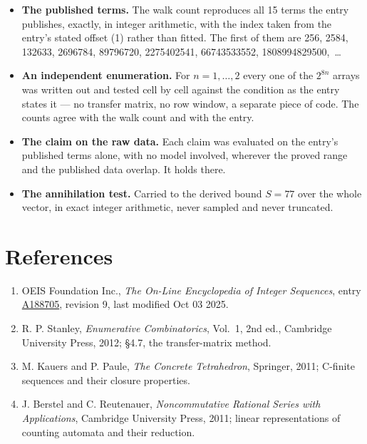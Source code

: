 \documentclass[11pt]{article}
\theoremstyle{definition}
\begin{document}
\begin{itemize}

\item {\bfseries The published terms.} The walk count reproduces all 15 terms the entry publishes, exactly, in integer arithmetic, with the index taken from the entry's stated offset (1) rather than fitted. The first of them are 256, 2584, 132633, 2696784, 89796720, 2275402541, 66743533552, 1808994829500,~\dots

\item {\bfseries An independent enumeration.} For $n = 1,\dots,2$ every one of the $2^{8n}$ arrays was written out and tested cell by cell against the condition as the entry states it --- no transfer matrix, no row window, a separate piece of code. The counts agree with the walk count and with the entry.

\item {\bfseries The claim on the raw data.} Each claim was evaluated on the entry's published terms alone, with no model involved, wherever the proved range and the published data overlap. It holds there.

\item {\bfseries The annihilation test.} Carried to the derived bound $S = 77$ over the whole vector, in exact integer arithmetic, never sampled and never truncated.

\end{itemize}

\section{References}

\begin{enumerate}

\item OEIS Foundation Inc., \emph{The On-Line Encyclopedia of Integer Sequences}, entry \href{https://oeis.org/A188705}{A188705}, revision 9, last modified Oct 03 2025.

\item R. P. Stanley, \emph{Enumerative Combinatorics}, Vol.~1, 2nd ed., Cambridge University Press, 2012; \S4.7, the transfer-matrix method.

\item M. Kauers and P. Paule, \emph{The Concrete Tetrahedron}, Springer, 2011; C-finite sequences and their closure properties.

\item J. Berstel and C. Reutenauer, \emph{Noncommutative Rational Series with Applications}, Cambridge University Press, 2011; linear representations of counting automata and their reduction.

\end{enumerate}
\end{document}
